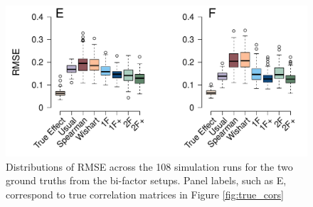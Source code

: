 \documentclass[man, 12pt]{apa7} %
\begin{document}
\begin{figure}[htbp]
    \centering  
    \includegraphics[width=\linewidth, height=1.1\linewidth, keepaspectratio]{_figs/rmse-res3.pdf}
    \caption{Distributions of RMSE across the 108 simulation runs for the two ground truths from the bi-factor setups. Panel labels, such as E, correspond to true correlation matrices in Figure \ref{fig:true_cors}}  
    \label{fig:rmse-res3}
\end{figure}
\end{document}
